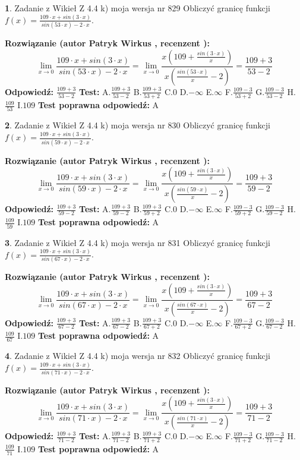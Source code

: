 \documentclass[12pt, a4paper]{article}
\theoremstyle{definition} %
\newtheorem{zad}{}
\newcommand{\zadStart}[1]{\begin{zad}#1\newline}
\newcommand{\zadStop}{\end{zad}}
\newcommand{\rozwStart}[2]{\noindent \textbf{Rozwiązanie (autor #1 , recenzent #2): }\newline}
\newcommand{\rozwStop}{\newline}
\newcommand{\odpStart}{\noindent \textbf{Odpowiedź:}\newline}
\newcommand{\odpStop}{\newline}
\newcommand{\testStart}{\noindent \textbf{Test:}\newline}
\newcommand{\testStop}{\newline}
\newcommand{\kluczStart}{\noindent \textbf{Test poprawna odpowiedź:}\newline}
\newcommand{\kluczStop}{\newline}
\begin{document}
\zadStart{Zadanie z Wikieł Z 4.4 k) moja wersja nr 829}
Obliczyć granicę funkcji $f(x)=\frac{109\cdot x +sin(3\cdot x)}{sin(53\cdot x) -2\cdot x}$.
\zadStop
\rozwStart{Patryk Wirkus}{}
$$\lim\limits_{x\to 0}\frac{109\cdot x +sin(3\cdot x)}{sin(53\cdot x) -2\cdot x}
=\lim\limits_{x\to 0}\frac{x(109+\frac{sin(3\cdot x)}{x})}{x(\frac{sin(53\cdot x)}{x}-2)}
=\frac{109+3}{53-2}$$
\rozwStop
\odpStart
$\frac{109+3}{53-2}$
\odpStop
\testStart
A.$\frac{109+3}{53-2}$
B.$\frac{109+3}{53+2}$
C.$0$
D.$-\infty$
E.$\infty$
F.$\frac{109-3}{53+2}$
G.$\frac{109-3}{53-2}$
H.$\frac{109}{53}$
I.$109$
\testStop
\kluczStart
A
\kluczStop



\zadStart{Zadanie z Wikieł Z 4.4 k) moja wersja nr 830}
Obliczyć granicę funkcji $f(x)=\frac{109\cdot x +sin(3\cdot x)}{sin(59\cdot x) -2\cdot x}$.
\zadStop
\rozwStart{Patryk Wirkus}{}
$$\lim\limits_{x\to 0}\frac{109\cdot x +sin(3\cdot x)}{sin(59\cdot x) -2\cdot x}
=\lim\limits_{x\to 0}\frac{x(109+\frac{sin(3\cdot x)}{x})}{x(\frac{sin(59\cdot x)}{x}-2)}
=\frac{109+3}{59-2}$$
\rozwStop
\odpStart
$\frac{109+3}{59-2}$
\odpStop
\testStart
A.$\frac{109+3}{59-2}$
B.$\frac{109+3}{59+2}$
C.$0$
D.$-\infty$
E.$\infty$
F.$\frac{109-3}{59+2}$
G.$\frac{109-3}{59-2}$
H.$\frac{109}{59}$
I.$109$
\testStop
\kluczStart
A
\kluczStop



\zadStart{Zadanie z Wikieł Z 4.4 k) moja wersja nr 831}
Obliczyć granicę funkcji $f(x)=\frac{109\cdot x +sin(3\cdot x)}{sin(67\cdot x) -2\cdot x}$.
\zadStop
\rozwStart{Patryk Wirkus}{}
$$\lim\limits_{x\to 0}\frac{109\cdot x +sin(3\cdot x)}{sin(67\cdot x) -2\cdot x}
=\lim\limits_{x\to 0}\frac{x(109+\frac{sin(3\cdot x)}{x})}{x(\frac{sin(67\cdot x)}{x}-2)}
=\frac{109+3}{67-2}$$
\rozwStop
\odpStart
$\frac{109+3}{67-2}$
\odpStop
\testStart
A.$\frac{109+3}{67-2}$
B.$\frac{109+3}{67+2}$
C.$0$
D.$-\infty$
E.$\infty$
F.$\frac{109-3}{67+2}$
G.$\frac{109-3}{67-2}$
H.$\frac{109}{67}$
I.$109$
\testStop
\kluczStart
A
\kluczStop



\zadStart{Zadanie z Wikieł Z 4.4 k) moja wersja nr 832}
Obliczyć granicę funkcji $f(x)=\frac{109\cdot x +sin(3\cdot x)}{sin(71\cdot x) -2\cdot x}$.
\zadStop
\rozwStart{Patryk Wirkus}{}
$$\lim\limits_{x\to 0}\frac{109\cdot x +sin(3\cdot x)}{sin(71\cdot x) -2\cdot x}
=\lim\limits_{x\to 0}\frac{x(109+\frac{sin(3\cdot x)}{x})}{x(\frac{sin(71\cdot x)}{x}-2)}
=\frac{109+3}{71-2}$$
\rozwStop
\odpStart
$\frac{109+3}{71-2}$
\odpStop
\testStart
A.$\frac{109+3}{71-2}$
B.$\frac{109+3}{71+2}$
C.$0$
D.$-\infty$
E.$\infty$
F.$\frac{109-3}{71+2}$
G.$\frac{109-3}{71-2}$
H.$\frac{109}{71}$
I.$109$
\testStop
\kluczStart
A
\kluczStop
\end{document}
